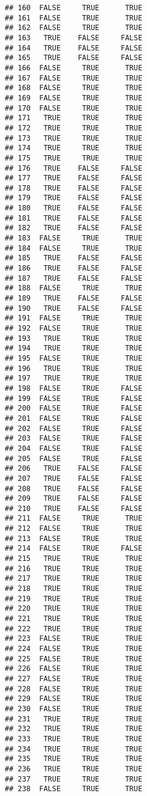 \documentclass[
]{article}
\begin{document}
\begin{verbatim}
## 160  FALSE     TRUE      TRUE
## 161  FALSE     TRUE      TRUE
## 162  FALSE     TRUE      TRUE
## 163   TRUE    FALSE     FALSE
## 164   TRUE    FALSE     FALSE
## 165   TRUE    FALSE     FALSE
## 166  FALSE     TRUE      TRUE
## 167  FALSE     TRUE      TRUE
## 168  FALSE     TRUE      TRUE
## 169  FALSE     TRUE      TRUE
## 170  FALSE     TRUE      TRUE
## 171   TRUE     TRUE      TRUE
## 172   TRUE     TRUE      TRUE
## 173   TRUE     TRUE      TRUE
## 174   TRUE     TRUE      TRUE
## 175   TRUE     TRUE      TRUE
## 176   TRUE    FALSE     FALSE
## 177   TRUE    FALSE     FALSE
## 178   TRUE    FALSE     FALSE
## 179   TRUE    FALSE     FALSE
## 180   TRUE    FALSE     FALSE
## 181   TRUE    FALSE     FALSE
## 182   TRUE    FALSE     FALSE
## 183  FALSE     TRUE      TRUE
## 184  FALSE     TRUE      TRUE
## 185   TRUE    FALSE     FALSE
## 186   TRUE    FALSE     FALSE
## 187   TRUE    FALSE     FALSE
## 188  FALSE     TRUE      TRUE
## 189   TRUE    FALSE     FALSE
## 190   TRUE    FALSE     FALSE
## 191  FALSE     TRUE      TRUE
## 192  FALSE     TRUE      TRUE
## 193   TRUE     TRUE      TRUE
## 194   TRUE     TRUE      TRUE
## 195  FALSE     TRUE      TRUE
## 196   TRUE     TRUE      TRUE
## 197   TRUE     TRUE      TRUE
## 198  FALSE     TRUE     FALSE
## 199  FALSE     TRUE     FALSE
## 200  FALSE     TRUE     FALSE
## 201  FALSE     TRUE     FALSE
## 202  FALSE     TRUE     FALSE
## 203  FALSE     TRUE     FALSE
## 204  FALSE     TRUE     FALSE
## 205  FALSE     TRUE     FALSE
## 206   TRUE    FALSE     FALSE
## 207   TRUE    FALSE     FALSE
## 208   TRUE    FALSE     FALSE
## 209   TRUE    FALSE     FALSE
## 210   TRUE    FALSE     FALSE
## 211  FALSE     TRUE      TRUE
## 212  FALSE     TRUE      TRUE
## 213  FALSE     TRUE      TRUE
## 214  FALSE     TRUE     FALSE
## 215   TRUE     TRUE      TRUE
## 216   TRUE     TRUE      TRUE
## 217   TRUE     TRUE      TRUE
## 218   TRUE     TRUE      TRUE
## 219   TRUE     TRUE      TRUE
## 220   TRUE     TRUE      TRUE
## 221   TRUE     TRUE      TRUE
## 222   TRUE     TRUE      TRUE
## 223  FALSE     TRUE      TRUE
## 224  FALSE     TRUE      TRUE
## 225  FALSE     TRUE      TRUE
## 226  FALSE     TRUE      TRUE
## 227  FALSE     TRUE      TRUE
## 228  FALSE     TRUE      TRUE
## 229  FALSE     TRUE      TRUE
## 230  FALSE     TRUE      TRUE
## 231   TRUE     TRUE      TRUE
## 232   TRUE     TRUE      TRUE
## 233   TRUE     TRUE      TRUE
## 234   TRUE     TRUE      TRUE
## 235   TRUE     TRUE      TRUE
## 236   TRUE     TRUE      TRUE
## 237   TRUE     TRUE      TRUE
## 238  FALSE     TRUE      TRUE

\end{verbatim}
\end{document}
